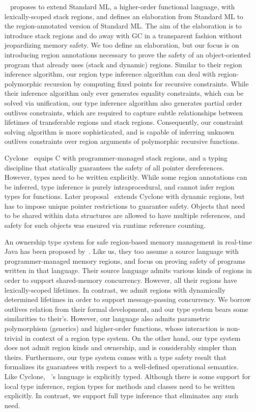 ~\cite{tofte97} proposes to extend Standard ML, a higher-order
functional language, with lexically-scoped stack regions, and defines
an elaboration from Standard ML to the region-annotated version of
Standard ML. The aim of the elaboration is to introduce stack regions
and do away with GC in a transparent fashion without jeopardizing
memory safety. We too define an elaboration, but our focus is on
introducing region annotations necessary to prove the safety of an
object-oriented program that already uses (stack and dynamic) regions.
Similar to their region inference algorithm, our region type inference
algorithm can deal with region-polymorphic recursion by computing
fixed points for recursive constraints. While their inference
algorithm only ever generates equality constraints, which can be
solved via unification, our type inference algorithm also generates
partial order outlives constraints, which are required to capture
subtle relationships between lifetimes of transferable regions and
stack regions. Consequently, our constraint solving algorithm is more
sophisticated, and is capable of inferring unknown outlives
constraints over region arguments of polymorphic recursive functions.

Cyclone~\cite{cyclone02} equips C with programmer-managed stack
regions, and a typing discipline that statically guarantees the safety
of all pointer dereferences. However, types need to be written
explicitly. While some region annotations can be inferred, type
inference is purely intraprocedural, and cannot infer region types for
functions. Later proposal~\cite{cyclone04} extends Cyclone with
dynamic regions, but has to impose unique pointer restrictions to
guarantee safety. Objects that need to be shared within data
structures are allowed to have multiple references, and safety for
such objects was ensured via runtime reference counting.

An ownership type system for safe region-based memory management in
real-time Java has been proposed by~\cite{MIT03}. Like us, they too
assume a source language with programmer-managed memory regions, and
focus on proving safety of programs written in that language. Their
source language admits various kinds of regions in order to support
shared-memory concurrency. However, all their regions have
lexically-scoped lifetimes. In contrast, we admit regions with
dynamically determined lifetimes in order to support message-passing
concurrency. We borrow outlives relation from their formal
development, and our type system bears some similarities to their's.
However, our language also admits parametric polymorphism (generics)
and higher-order functions, whose interaction is non-trivial in
context of a region type system. On the other hand, our type system
does not admit region kinds and ownership, and is considerably simpler
than theirs. Furthermore, our type system comes with a type
safety result that formalizes its guarantees with respect to a
well-defined operational semantics. Like Cyclone, ~\cite{MIT03}'s
language is explicitly typed. Although there is some support for local
type inference, region types for methods and classes need to be
written explicitly. In contrast, we support full type inference that
eliminates any such need.

